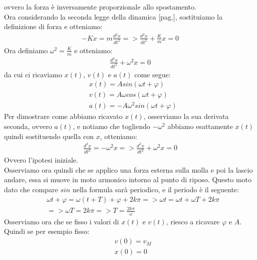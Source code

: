             ovvero la forza è inversamente proporzionale allo spostamento.\\
            Ora considerando la seconda legge della dinamica [pag.\pageref{II_legge_dinamica}], sostituiamo la definizione di forza e otteniamo:
            \begin{align*}
                -Kx=m\frac{d^2x}{{dt}^2}=>\frac{d^2x}{{dt}^2}+\frac{K}{m}x=0
            \end{align*}
            Ora definiamo $\omega^2=\frac{K}{m}$ e otteniamo:
            \begin{align*}
                \frac{d^2x}{{dt}^2}+\omega^2x=0
            \end{align*}
            da cui ci ricaviamo $x(t)$, $v(t)$ e $a(t)$ come segue:
            \begin{align*}
                &x(t)=Asin(\omega t + \varphi)\\
                &v(t)=A\omega cos(\omega t + \varphi)\\
                &a(t)=-A\omega^2sin(\omega t + \varphi)
            \end{align*}
            Per dimostrare come abbiamo ricavato $x(t)$, osserviamo la sua derivata seconda, ovvero $a(t)$, e notiamo che togliendo $-\omega^2$ abbiamo esattamente $x(t)$ quindi sostituendo quella con $x$, otteniamo:
            \begin{align*}
                \frac{d^2x}{{dt}^2}=-\omega^2x=>\frac{d^2x}{{dt}^2}+\omega^2x=0
            \end{align*}
            Ovvero l'ipotesi iniziale.\\
            Osserviamo ora quindi che se applico una forza esterna sulla molla e poi la lascio andare, essa si muove in moto armonico intorno al punto di riposo. Questo moto dato che compare $sin$ nella formula sarà periodico, e il periodo è il seguente:
            \begin{align*}
                &\omega t+\varphi=\omega (t+T)+\varphi + 2k\pi=>\omega t=\omega t+\omega T+2k\pi\\
                &=>\omega T=2k\pi=>T=\frac{2k\pi}{\omega}
            \end{align*}
            Osserviamo ora che se fisso i valori di $x(t)$ e $v(t)$, riesco a ricavare $\varphi$ e $A$. Quindi se per esempio fisso:
            \begin{align*}
                &v(0)=v_M\\
                &x(0)=0
            \end{align*}
